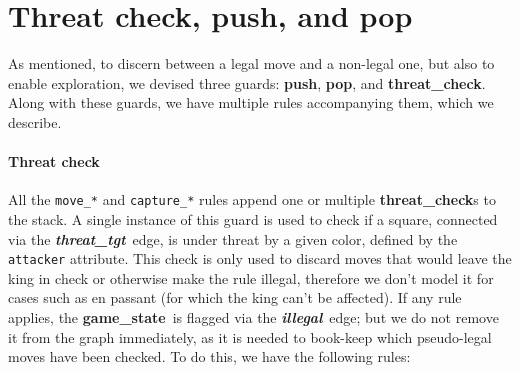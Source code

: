 \documentclass[a4paper, 10pt]{scrartcl}
\newcommand{\noderepr}[1]{\textsf{\textbf{#1}}}
\newcommand{\edgerepr}[1]{\textit{\textbf{#1}}}
\newcommand{\gamestate}{\noderepr{game\_state}}
\newcommand{\push}{\noderepr{push}}
\newcommand{\pop}{\noderepr{pop}}
\newcommand{\threatcheck}{\noderepr{threat\_check}}
\newcommand{\threattgt}{\edgerepr{threat\_tgt}}
\newcommand{\illegal}{\edgerepr{illegal}}
\begin{document}
    \section{Threat check, push, and pop}
    As mentioned, to discern between a legal move and a non-legal one, but also to enable exploration, we devised three guards: \push, \pop, and \threatcheck.
    Along with these guards, we have multiple rules accompanying them, which we describe.
    \paragraph*{Threat check} All the \texttt{move\_*} and \texttt{capture\_*} rules append one or multiple \threatcheck s to the stack. A single instance of this guard is used to check if a square, connected via the \threattgt\ edge, is under threat by a given color, defined by the \texttt{attacker} attribute. This check is only used to discard moves that would leave the king in check or otherwise make the rule illegal, therefore we don't model it for cases such as en passant (for which the king can't be affected).
    If any rule applies, the \gamestate\ is flagged via the \illegal\ edge; but we do not remove it from the graph immediately, as it is needed to book-keep which pseudo-legal moves have been checked.
    To do this, we have the following rules:
\end{document}
